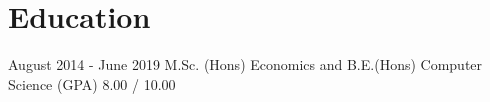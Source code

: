 \section{Education}\label{sec:education}
\startListPointOneInchAwayFromLeft
{} {August 2014 - June 2019} {M.Sc. (Hons) Economics and B.E.(Hons) Computer Science} {(GPA) 8.00 / 10.00}
\makeLinePointOneInchAwayEnd
